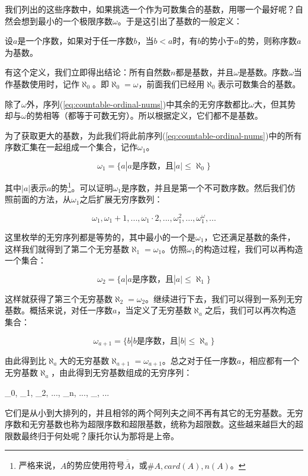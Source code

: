 \documentclass{article}
\begin{document}
我们列出的这些序数中，如果挑选一个作为可数集合的基数，用哪一个最好呢？自然会想到最小的一个极限序数$\omega$。于是这引出了基数的一般定义：

\begin{definition}
设$a$是一个序数，如果对于任一序数$b$，当$b < a$时，有$b$的势小于$a$的势，则称序数$a$为基数。
\end{definition}

有这个定义，我们立即得出结论：所有自然数$n$都是基数，并且$\omega$是基数。序数$\omega$当作基数使用时，记作$\aleph_0$。即$\aleph_0 = \omega$，前面我们已经用$\aleph_0$表示可数集合的基数。

除了$\omega$外，序列(\ref{eq:countable-ordinal-nums})中其余的无穷序数都比$\omega$大，但其势却与$\omega$的势相等（都等于可数无穷）。所以根据定义，它们都不是基数。

为了获取更大的基数，为此我们将此前序列(\ref{eq:countable-ordinal-nums})中的所有序数汇集在一起组成一个集合，记作$\omega_1$。

\[
\omega_1 = \{ a | a \text{是序数，且} |a| \leq \aleph_0\}
\]

其中$|a|$表示$a$的势\footnote{严格来说，$A$的势应使用符号$\overline{\overline{A}}$，或$\#A, card(A), n(A)$。}。可以证明$\omega_1$是序数，并且是第一个不可数序数。然后我们仿照前面的方法，从$\omega_1$之后扩展无穷序数列：

\[
\omega_1, \omega_1 + 1, ..., \omega_1 \cdot 2, ..., \omega_1^2, ..., \omega_1^\omega, ...
\]

这里枚举的无穷序列都是等势的，其中最小的一个是$\omega_1$，它还满足基数的条件，这样我们就得到了第二个无穷基数$\aleph_1 = \omega_1$。仿照$\omega_1$的构造过程，我们可以再构造一个集合：

\[
\omega_2 = \{ a | a \text{是序数，且} |a| \leq \aleph_1\}
\]

这样就获得了第三个无穷基数$\aleph_2 = \omega_2$。继续进行下去，我们可以得到一系列无穷基数。概括来说，对任一序数$a$，当定义了无穷基数$\aleph_a$之后，我们可以再次构造集合：

\[
\omega_{a+1} = \{ b | b \text{是序数，且} |b| \leq \aleph_a\}
\]

由此得到比$\aleph_a$大的无穷基数$\aleph_{a+1} = \omega_{a+1}$。总之对于任一序数$a$，相应都有一个无穷基数$\aleph_a$，由此得到无穷基数组成的无穷序列：

\be
\aleph_0, \aleph_1, \aleph_2, ..., \aleph_n, ..., \aleph_{\omega}, ...
\ee

它们是从小到大排列的，并且相邻的两个阿列夫之间不再有其它的无穷基数。无穷序数和无穷基数也称为超限序数和超限基数，统称为超限数。这些越来越巨大的超限数最终归于何处呢？康托尔认为那将是上帝。
\end{document}
